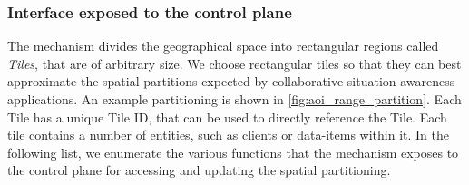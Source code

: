 \subsubsection{Interface exposed to the control plane}
\par The mechanism divides the geographical space into rectangular regions called \textit{Tiles}, that are of arbitrary size. We choose rectangular tiles so that they can best approximate the spatial partitions expected by collaborative situation-awareness applications. An example partitioning is shown in \cref{fig:aoi_range_partition}. Each Tile has a unique Tile ID, that can be used to directly reference the Tile. Each tile contains a number of entities, such as clients or data-items within it. In the following list, we enumerate the various functions that the mechanism exposes to the control plane for accessing and updating the spatial partitioning.
